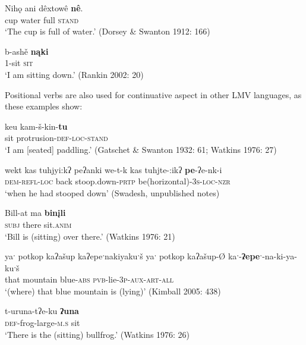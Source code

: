 \documentclass[output=paper]{LSP/langsci}
\begin{document}
\ea
\settowidth{}
\gll	Nihǫ 	ani 	dêxtowê \textbf{nê}.\\
		cup water full  \textsc{stand}\\ 
\glt	`The cup is full of water.' (Dorsey \& Swanton 1912: 166)
\z
		
\ea
\settowidth{}
\gll	b-ashě \textbf{nąki}\\
		1-sit \textsc{sit}\\ 
\glt	`I am sitting down.' (Rankin 2002: 20)
\z

Positional verbs are also used for continuative aspect in other LMV languages, as these examples show:

\ea
\settowidth{}
\gll	keu kam-š-kin-\textbf{tu}\\
		sit protrusion-\textsc{def-loc-stand}\\ 
\glt `I am [seated] paddling.' (Gatschet \& Swanton 1932: 61; Watkins 1976: 27)
\z

\ea	
\settowidth{}
wekt kas tuhjyi:kʔ peʔanki 
\gll		we-t-k 	 kas 	 tuhjte-:ikʔ 	 \textbf{pe}-ʔe-nk-i\\
		\textsc{dem-refl-loc} back	  stoop.down-\textsc{prtp} be(horizontal)-\textsc{3s-loc-nzr}\\
\glt	`when he had stooped down' (Swadesh, unpublished notes)
\z

\ea
\settowidth{}
\gll	Bill-at ma \textbf{binįli}\\
	 \textsc{subj} there sit.\textsc{anim}\\ 
\glt `Bill is (sitting) over there.' (Watkins 1976: 21)
\z
		
\ea	
\settowidth{} 
yaˑ potkop kaʔašup kaʔepeˑnakiyakuˑš\footnotemark {}
\gll		yaˑ potkop kaʔašup-Ø kaˑ-\textbf{ʔepeˑ}-na-ki-ya-kuˑš\\
		that mountain blue-\textsc{abs} \textsc{pvb}-lie-\textsc{3p-aux-art-all}\\
\glt	`(where) that blue mountain is (lying)' (Kimball 2005: 438)
\z

\ea
\settowidth{}
\gll	t-uruna-tʔe-ku 	\textbf{ʔuna}\\
 \textsc{def}-frog-large-\textsc{m.s} sit\\ 
\glt `There is the (sitting) bullfrog.' (Watkins 1976: 26)
\z
\end{document}
